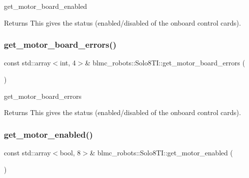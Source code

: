 get\+\_\+motor\+\_\+board\+\_\+enabled 

\begin{DoxyReturn}{Returns}
This gives the status (enabled/disabled of the onboard control cards). 
\end{DoxyReturn}
\mbox{\label{classblmc__robots_1_1Solo8TI_aa7d82d290e330c86af2f21d16098c460}} 
\subsubsection{\texorpdfstring{get\+\_\+motor\+\_\+board\+\_\+errors()}{get\_motor\_board\_errors()}}
{\footnotesize\ttfamily const std\+::array$<$int, 4$>$\& blmc\+\_\+robots\+::\+Solo8\+T\+I\+::get\+\_\+motor\+\_\+board\+\_\+errors (\begin{DoxyParamCaption}{ }\end{DoxyParamCaption})\hspace{0.3cm}{\ttfamily [inline]}}



get\+\_\+motor\+\_\+board\+\_\+errors 

\begin{DoxyReturn}{Returns}
This gives the status (enabled/disabled of the onboard control cards). 
\end{DoxyReturn}
\mbox{\label{classblmc__robots_1_1Solo8TI_acd7e33f11be0d4e63030d1ec4815eba5}} 
\subsubsection{\texorpdfstring{get\+\_\+motor\+\_\+enabled()}{get\_motor\_enabled()}}
{\footnotesize\ttfamily const std\+::array$<$bool, 8$>$\& blmc\+\_\+robots\+::\+Solo8\+T\+I\+::get\+\_\+motor\+\_\+enabled (\begin{DoxyParamCaption}{ }\end{DoxyParamCaption})\hspace{0.3cm}{\ttfamily [inline]}}



